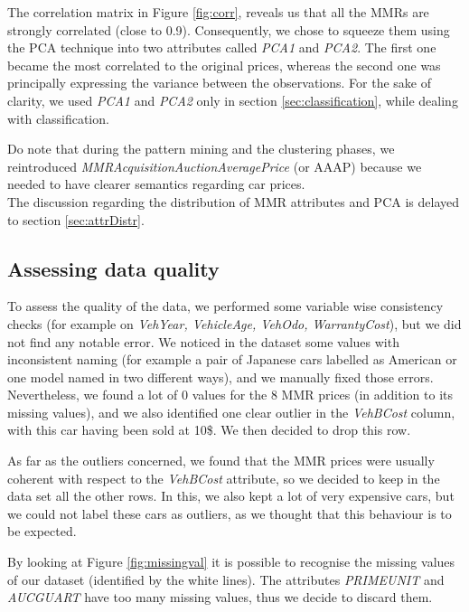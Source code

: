 \documentclass{article}
\begin{document}
	The correlation matrix in Figure \ref{fig:corr}, reveals us that all the MMRs are strongly correlated (close to 0.9). Consequently, we chose to squeeze them using the PCA technique into two attributes called \emph{PCA1} and \emph{PCA2}. The first one became the most correlated to the original prices, whereas the second one was principally expressing the variance between the observations. For the sake of clarity, we used \emph{PCA1} and \emph{PCA2} only in section \ref{sec:classification}, while dealing with classification.
	
	Do note that during the pattern mining and the clustering phases, we reintroduced \emph{MMRAcquisitionAuctionAveragePrice} (or AAAP) because we needed to have clearer semantics regarding car prices. \\
	The discussion regarding the distribution of MMR attributes and PCA is delayed to section \ref{sec:attrDistr}.
	
	\subsection{Assessing data quality}
	
	To assess the quality of the data, we performed some variable wise consistency checks (for example on \emph{VehYear, VehicleAge, VehOdo, WarrantyCost}), but we did not find any notable error.
	We noticed in the dataset some values with inconsistent naming (for example a pair of Japanese cars labelled as American or one model named in two different ways), and we manually fixed those errors.
	Nevertheless, we found a lot of 0 values for the 8 MMR prices (in addition to its missing values), and we also identified one clear outlier in the \emph{VehBCost} column, with this car having been sold at 10\$. We then decided to drop this row.
	
	As far as the outliers concerned, we found that the MMR prices were usually coherent with respect to the \emph{VehBCost} attribute, so we decided to keep in the data set all the other rows. In this, we also kept a lot of very expensive cars, but we could not label these cars as outliers, as we thought that this behaviour is to be expected.
	
	By looking at Figure \ref{fig:missingval} it is possible to recognise the missing values of our dataset (identified by the white lines). The attributes \emph{PRIMEUNIT} and \emph{AUCGUART} have too many missing values, thus we decide to discard them.\\
	
\end{document}

